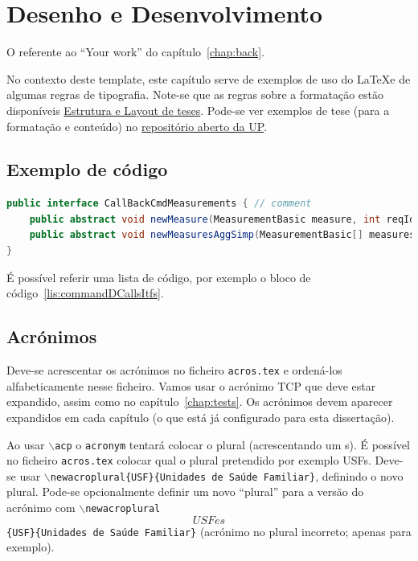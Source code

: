 \chapter{Desenho e Desenvolvimento}\label{chap:devel}

O referente ao ``Your work'' do capítulo~\ref{chap:back}.

No contexto deste template, este capítulo serve de exemplos de uso do \LaTeX e 
de algumas regras de tipografia. Note-se que as regras sobre a formatação estão 
disponíveis 
\href{https://sigarra.up.pt/fcup/pt/conteudos_geral.ver?pct_pag_id=1011511&pct_parametros=pv_unidade=97&pct_grupo=33673&pct_grupo=33670&pct_grupo=33675&pct_grupo=33683&pct_grupo=36711#36711}{Estrutura 
e Layout de teses}. Pode-se ver exemplos de tese (para a formatação e conteúdo) 
no \href{https://repositorio-aberto.up.pt/handle/10216/9535}{repositório aberto 
da UP}.

\section{Exemplo de código}

\begin{lstlisting}[numbers=none,language=java,caption={[CommandDaemonCallsItf]
   {CommandDaemon} callback interfaces},label=lis:commandDCallsItfs,float=htb]
public interface CallBackCmdMeasurements { // comment
	public abstract void newMeasure(MeasurementBasic measure, int reqId);
	public abstract void newMeasuresAggSimp(MeasurementBasic[] measuresAggSimp, 'A string');
}
\end{lstlisting}

É possível referir uma lista de código, por exemplo o bloco de código~\ref{lis:commandDCallsItfs}.

\section{Acrónimos}

Deve-se acrescentar os acrónimos no ficheiro \texttt{acros.tex} e ordená-los 
alfabeticamente nesse ficheiro.
Vamos usar o acrónimo \ac{TCP} que deve estar expandido, assim como no 
capítulo~\ref{chap:tests}. Os acrónimos devem aparecer expandidos em cada 
capítulo (o que está já configurado para esta dissertação).

Ao usar $\backslash$\texttt{acp} o \texttt{acronym} tentará colocar o plural 
(acrescentando um s). É possível no ficheiro \texttt{acros.tex} colocar qual o 
plural pretendido por exemplo \acp{USF}. Deve-se usar 
$\backslash$\texttt{newacroplural\{USF\}\{Unidades de Saúde Familiar\}}, 
definindo o novo plural. Pode-se opcionalmente definir um novo ``plural'' para a 
versão do acrónimo com 
$\backslash$\texttt{newacroplural\[USFes\]\{USF\}\{Unidades de Saúde Familiar\}} 
(acrónimo no plural incorreto; apenas para exemplo).

